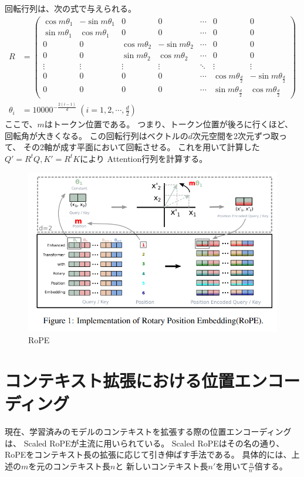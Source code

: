 \documentclass{jsarticle}
\begin{document}
        回転行列は、次の式で与えられる。
        \begin{align*}
            R &= \begin{pmatrix}
                    \cos m\theta_1 & -\sin m\theta_1 & 0 & 0 & \cdots & 0 & 0 \\
                    \sin m\theta_1 & \cos m\theta_1 & 0 & 0 & \cdots & 0 & 0 \\
                    0 & 0 & \cos m\theta_2 & -\sin m\theta_2 & \cdots & 0 & 0 \\
                    0 & 0 & \sin m\theta_2 & \cos m\theta_2 & \cdots & 0 & 0 \\
                    \vdots & \vdots & \vdots & \vdots & \ddots & \vdots & \vdots \\
                    0 & 0 & 0 & 0 & \cdots & \cos m\theta_\frac{d}{2} & -\sin m\theta_\frac{d}{2} \\
                    0 & 0 & 0 & 0 & \cdots & \sin m\theta_\frac{d}{2} & \cos m\theta_\frac{d}{2}
                \end{pmatrix} \\
            \theta_i &= 10000^{-\frac{2(i-1)}{d}} \ \left(i = 1, 2, \cdots, \frac{d}{2}\right)
        \end{align*}
        ここで、$m$はトークン位置である。
        つまり、トークン位置が後ろに行くほど、回転角が大きくなる。
        この回転行列はベクトルの$d$次元空間を2次元ずつ取って、
        その2軸が成す平面において回転させる。
        これを用いて計算した$Q' = R^t\!Q, K' = R^t\!K$により
        Attention行列を計算する。
        \begin{figure}[h]
            \centering
            \includegraphics[width=.8\linewidth]{rope_image.png}
            \caption{RoPE\cite{rope}}
        \end{figure}

\section{コンテキスト拡張における位置エンコーディング}
    現在、学習済みのモデルのコンテキストを拡張する際の位置エンコーディングは、
    Scaled RoPEが主流に用いられている\cite{kaiokendev}。
    Scaled RoPEはその名の通り、
    RoPEをコンテキスト長の拡張に応じて引き伸ばす手法である。
    具体的には、上述の$m$を元のコンテキスト長$n$と
    新しいコンテキスト長$n'$を用いて$\displaystyle\frac{n}{n'}$倍する。
\end{document}
